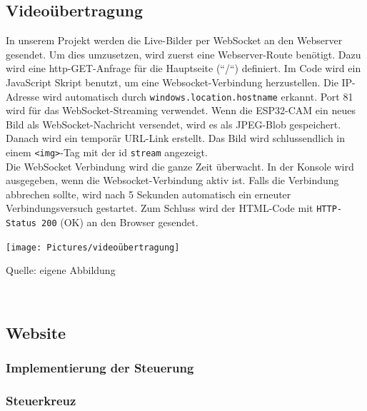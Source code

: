 \documentclass[ngerman,12pt,a4paper]{article}
\begin{document}
			\subsection{Videoübertragung}
		    \label{subsec:Videoübertragung}
			
	In unserem Projekt werden die Live-Bilder per WebSocket an den Webserver gesendet. Um dies umzusetzen, wird zuerst eine Webserver-Route benötigt. Dazu wird eine http-GET-Anfrage für die Hauptseite (“/“) definiert. Im Code wird ein JavaScript Skript benutzt, um eine Websocket-Verbindung herzustellen. Die IP-Adresse wird automatisch durch \texttt{windows.location.hostname} erkannt. Port 81 wird für das WebSocket-Streaming verwendet. Wenn die ESP32-CAM ein neues Bild als WebSocket-Nachricht versendet, wird es als JPEG-Blob gespeichert. Danach wird ein temporär URL-Link erstellt. Das Bild wird schlussendlich in einem \texttt{<img>}-Tag mit der id \texttt{stream} angezeigt. \\[0.5cm]
	Die WebSocket Verbindung wird die ganze Zeit überwacht. In der Konsole wird ausgegeben, wenn die Websocket-Verbindung aktiv ist. Falls die Verbindung abbrechen sollte, wird nach 5 Sekunden automatisch ein erneuter Verbindungsversuch gestartet. Zum Schluss wird der HTML-Code mit \texttt{HTTP-Status 200} (OK) an den Browser gesendet. 
	\begin{center}
		\begin{minipage}[t]{0.75\textwidth}
			\texttt{[image: Pictures/videoübertragung]}
			\label{fig:Videoübertragung}
			\vspace{-10pt}
			\begin{center}
				\par\small Quelle: eigene Abbildung 
			\end{center}
		\end{minipage} \\[0.75cm]
	\end{center}
	
		\subsection{Website}

			\subsubsection{Implementierung der Steuerung}
			
				\subsubsection*{Steuerkreuz}
				
\end{document}
